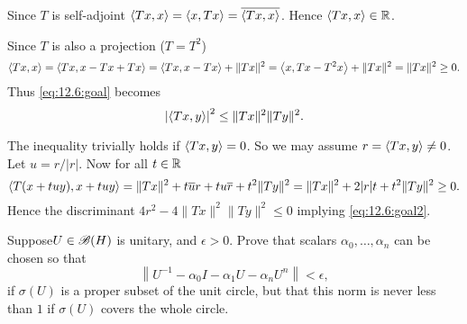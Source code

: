 \begin{enumerate}
Since $T$ is self-adjoint
\(\left\langle Tx,x \right\rangle = \left\langle x,Tx \right\rangle=\overline{\left\langle Tx,x \right\rangle}\).
Hence \(\left\langle Tx,x \right\rangle\in\mathbb{R}\).

Since $T$ is also a projection (\(T=T^2\))
\begin{equation*}
\left\langle Tx,x \right\rangle
= \left\langle Tx,x - Tx + Tx \right\rangle 
= \left\langle Tx,x - Tx \right\rangle + \|Tx\|^2
= \left\langle x,Tx - T^2x \right\rangle + \|Tx\|^2
= \|Tx\|^2 \geq 0.
\end{equation*}
Thus \eqref{eq:12.6:goal} becomes
\begin{equation} \label{eq:12.6:goal2}
\left|\left\langle Tx,y \right\rangle\right|^2 \leq \|Tx\|^2\|Ty\|^2.
\end{equation}

The inequality trivially holds if \(\left\langle Tx,y \right\rangle = 0\).
So we may assume \(r=\left\langle Tx,y \right\rangle \neq 0\).
Let \(u = r/|r|\).
Now for all \(t\in \mathbb{R}\)
\begin{equation*}
\left\langle T(x+tuy),x+tuy \right\rangle
= \|Tx\|^2 + t\overline{u}r + tu\overline{r} + t^2\|Ty\|^2
= \|Tx\|^2 + 2|r|t + t^2\|Ty\|^2
\geq 0.
\end{equation*}
Hence the discriminant \(4r^2 -4 \|Tx\|^2\|Ty\|^2 \leq 0\)
implying \eqref{eq:12.6:goal2}.


\iffalse
Also
\begin{equation*}
\lrangle{Tx, \overline{x}}
= \lrangle{x, T\overline{x}}
= \overline{\lrangle{T\overline{x}, x}
\end{equation*}
\fi

\begin{excopy}
Suppose\( U \in \mathscr{B}(H)\) is unitary,
and \(\epsilon > 0\). Prove that scalars \(\alpha_0,\ldots,\alpha_n\)
can be chosen so that
\begin{equation*}
\left\|U^{-1} - \alpha_0 I - \alpha_1 U - \alpha_n U^n\right\| < \epsilon,
\end{equation*}
if \(\sigma(U)\) is a proper subset of the unit circle,
but that this norm is never less than $1$ if
\(\sigma(U)\) covers the whole circle.
\end{excopy}
\unfinished

\begin{excopy}
\end{excopy}
\unfinished

\end{enumerate}


